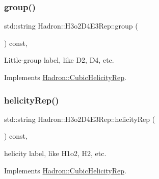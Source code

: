 \mbox{\label{structHadron_1_1H3o2D4E3Rep_acfb5a306823b56f4e03d1c7f818de23c}} 
\subsubsection{\texorpdfstring{group()}{group()}\hspace{0.1cm}{\footnotesize\ttfamily [5/5]}}
{\footnotesize\ttfamily std\+::string Hadron\+::\+H3o2\+D4\+E3\+Rep\+::group (\begin{DoxyParamCaption}{ }\end{DoxyParamCaption}) const\hspace{0.3cm}{\ttfamily [inline]}, {\ttfamily [virtual]}}

Little-\/group label, like D2, D4, etc. 

Implements \mbox{\hyperlink{structHadron_1_1CubicHelicityRep_a101a7d76cd8ccdad0f272db44b766113}{Hadron\+::\+Cubic\+Helicity\+Rep}}.

\mbox{\label{structHadron_1_1H3o2D4E3Rep_a12aad531820b348259dc0dfa8c0a259f}} 
\subsubsection{\texorpdfstring{helicityRep()}{helicityRep()}\hspace{0.1cm}{\footnotesize\ttfamily [1/3]}}
{\footnotesize\ttfamily std\+::string Hadron\+::\+H3o2\+D4\+E3\+Rep\+::helicity\+Rep (\begin{DoxyParamCaption}{ }\end{DoxyParamCaption}) const\hspace{0.3cm}{\ttfamily [inline]}, {\ttfamily [virtual]}}

helicity label, like H1o2, H2, etc. 

Implements \mbox{\hyperlink{structHadron_1_1CubicHelicityRep_af1096946b7470edf0a55451cc662f231}{Hadron\+::\+Cubic\+Helicity\+Rep}}.

\mbox{\label{structHadron_1_1H3o2D4E3Rep_a12aad531820b348259dc0dfa8c0a259f}} 

